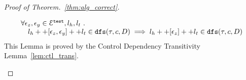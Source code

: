 \begin{proof}[Proof of Theorem.~\ref{thm:alg_correct}]
\begin{case}
\begin{subcase}[ $l_e = l_h ++ {[\event_{b_1}, \cdots, \event_{b_n}]} ++ l_t$ ]
\begin{equation}
  \begin{array}{l}
    \forall \mathtt{\epsilon}_z, \mathtt{\epsilon}_y \in \mathcal{E}^{\mathtt{{test}}}, l_h, l_t ~.~
     \\ \quad 
     l_h ++ [\mathtt{\epsilon}_z, \mathtt{\epsilon}_y] ++ l_t \in \mathtt{dfs}(\mathtt{\tau}, c, D)
    \implies l_h ++ [\mathtt{\epsilon}_z] ++ l_t \in \mathtt{dfs}(\mathtt{\tau}, c, D)
  \end{array}
  \end{equation}
%
This Lemma is proved by the Control Dependency Transitivity Lemma~\ref{lem:ctl_trans}.
\end{subcase}
%
\end{case}
%
\end{proof}